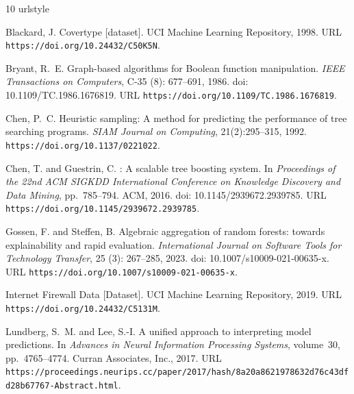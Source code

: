 \clearpage
\balance
\begin{thebibliography}{10}
\providecommand{\natexlab}[1]{#1}
\providecommand{\url}[1]{\texttt{#1}}
\expandafter\ifx\csname urlstyle\endcsname\relax
  \providecommand{\doi}[1]{doi: #1}\else
  \providecommand{\doi}{doi: \begingroup \urlstyle{rm}\Url}\fi

Blackard, J.
\newblock Covertype [dataset].
\newblock UCI Machine Learning Repository, 1998.
\newblock URL \url{https://doi.org/10.24432/C50K5N}.

Bryant, R.~E.
\newblock Graph-based algorithms for {Boolean} function manipulation.
\newblock \emph{IEEE Transactions on Computers}, C-35 (8):
  677--691, 1986.
\newblock \doi{10.1109/TC.1986.1676819}.
\newblock URL \url{https://doi.org/10.1109/TC.1986.1676819}.

Chen, P.~C.
\newblock Heuristic sampling: A method for predicting the performance of tree searching programs.
\newblock \emph{SIAM Journal on Computing}, 21(2):295--315, 1992.
\newblock \url{https://doi.org/10.1137/0221022}.

Chen, T. and Guestrin, C.
: A scalable tree boosting system.
\newblock In \emph{Proceedings of the 22nd ACM SIGKDD International Conference
  on Knowledge Discovery and Data Mining}, pp.\  785--794. ACM, 2016.
\newblock \doi{10.1145/2939672.2939785}.
\newblock URL \url{https://doi.org/10.1145/2939672.2939785}.

Gossen, F. and Steffen, B.
\newblock Algebraic aggregation of random forests: towards explainability and
  rapid evaluation.
\newblock \emph{International Journal on Software Tools for Technology
  Transfer}, 25 (3): 267--285, 2023.
\newblock \doi{10.1007/s10009-021-00635-x}.
\newblock URL \url{https://doi.org/10.1007/s10009-021-00635-x}.

Internet Firewall Data [Dataset].
\newblock UCI Machine Learning Repository, 2019.
\newblock URL \url{https://doi.org/10.24432/C5131M}.

Lundberg, S.~M. and Lee, S.-I.
\newblock A unified approach to interpreting model predictions.
\newblock In \emph{Advances in Neural Information Processing Systems},
  volume~30, pp.\  4765--4774. Curran Associates, Inc., 2017.
\newblock URL
  \url{https://proceedings.neurips.cc/paper/2017/hash/8a20a8621978632d76c43dfd28b67767-Abstract.html}.


\end{thebibliography}
